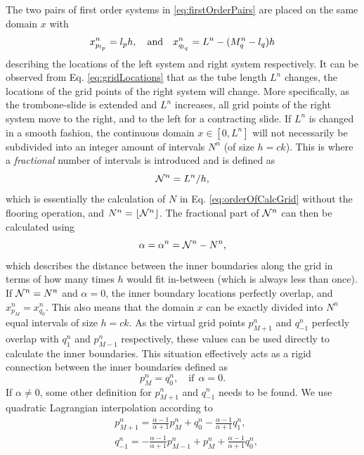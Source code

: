 The two pairs of first order systems in \eqref{eq:firstOrderPairs} are placed on the same domain $x$ with
\begin{equation}\label{eq:gridLocations}
    x_{p_{l_p}}^n = {l_p} h, \quad \text{and}\quad
    x_{q_{l_q}}^n = L^n-(M_q^n - {l_q})h
\end{equation}
describing the locations of the left system and right system respectively. It can be observed from Eq. \eqref{eq:gridLocations} that as the tube length $L^n$ changes, the locations of the grid points of the right system will change. More specifically, as the trombone-slide is extended and $L^n$ increases, all grid points of the right system move to the right, and to the left for a contracting slide. If $L^n$ is changed in a smooth fashion, the continuous domain $x \in [0,L^n]$ will not necessarily be subdivided into an integer amount of intervals $N^n$ (of size $h = ck$). This is where a \textit{fractional} number of intervals is introduced and is defined as 
\begin{equation}\label{eq:nfrac}
    \mathcal{N}^n = L^n/h,
\end{equation}
which is essentially the calculation of $N$ in Eq. \eqref{eq:orderOfCalcGrid} without the flooring operation, and $N^n = \lfloor \mathcal{N}^n \rfloor$. The fractional part of $\mathcal{N}^n$ can then be calculated using
\begin{equation}\label{eq:alphaDef}
    \alpha = \alpha^n = \mathcal{N}^n - N^n,
\end{equation}
which describes the distance between the inner boundaries along the grid in terms of how many times $h$ would fit in-between (which is always less than once). If $\mathcal{N}^n = N^n$ and $\alpha = 0$, the inner boundary locations perfectly overlap, and $x_{p_M}^n = x_{q_0}^n$. This also means that the domain $x$ can be exactly divided into $N^n$ equal intervals of size $h = ck$. As the virtual grid points $p_{M+1}^n$ and $q_{-1}^n$ perfectly overlap with $q_{1}^n$ and $p_{M-1}^n$ respectively, these values can be used directly to calculate the inner boundaries. This situation effectively acts as a rigid connection between the inner boundaries defined as
\begin{equation}\label{eq:rigidConn}
    p_M^n = q_0^n, \quad \text{if} \ \  \alpha = 0.
\end{equation}
%
If $\alpha \neq 0$, some other definition for $p_{M+1}^n$ and $q_{-1}^n$ needs to be found. We use quadratic Lagrangian interpolation according to
\begin{subequations}\label{eq:connectionInterpol}
\begin{align}
        &p_{M+1}^n = \frac{\alpha - 1}{\alpha + 1}p_{M}^n + q_0^n - \frac{\alpha - 1}{\alpha + 1}q_1^n,
    \label{eq:calcPMp1}\\
        &q_{-1}^n
        =-\frac{\alpha - 1}{\alpha + 1}p_{M-1}^n + p_{M}^n+ \frac{\alpha - 1}{\alpha + 1}q_{0}^n\label{eq:calcQm1},
\end{align}
\end{subequations}
